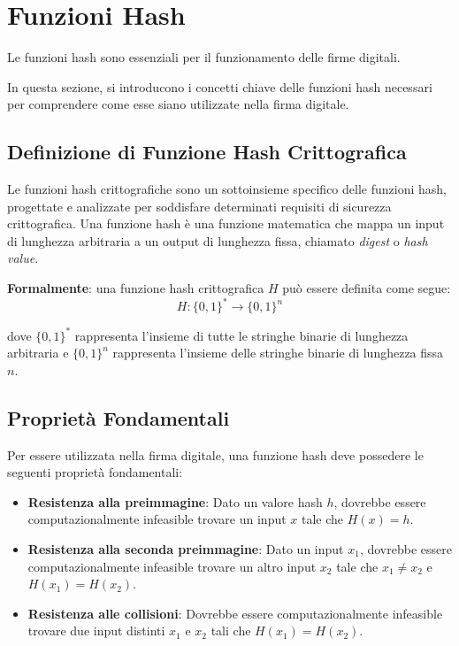 \documentclass[a4paper,12pt]{report}
\begin{document}
\section{Funzioni Hash}
Le funzioni hash sono essenziali per il funzionamento delle firme digitali.

In questa sezione, si introducono i concetti chiave delle funzioni hash necessari per comprendere come esse siano utilizzate nella firma digitale.

\subsection*{Definizione di Funzione Hash Crittografica}
Le funzioni hash crittografiche sono un sottoinsieme specifico delle funzioni hash, progettate e analizzate per soddisfare determinati requisiti di sicurezza crittografica. 
Una funzione hash è una funzione matematica che mappa un input di lunghezza arbitraria a un output di lunghezza fissa, chiamato \textit{digest} o \textit{hash value}.

\textbf{Formalmente}: una funzione hash crittografica $H$ può essere definita come segue:
\[H: \{0,1\}^* \rightarrow \{0,1\}^n\]

dove $\{0,1\}^*$ rappresenta l'insieme di tutte le stringhe binarie di lunghezza arbitraria e $\{0,1\}^n$ rappresenta l'insieme delle stringhe binarie di lunghezza fissa $n$.

\subsection*{Proprietà Fondamentali}

Per essere utilizzata nella firma digitale, una funzione hash deve possedere le seguenti proprietà fondamentali:

\begin{itemize}
    \item \textbf{Resistenza alla preimmagine}: Dato un valore hash $h$, dovrebbe essere computazionalmente infeasible trovare un input $x$ tale che $H(x) = h$.
    \item \textbf{Resistenza alla seconda preimmagine}: Dato un input $x_1$, dovrebbe essere computazionalmente infeasible trovare un altro input $x_2$ tale che $x_1 \neq x_2$ e $H(x_1) = H(x_2)$.
    \item \textbf{Resistenza alle collisioni}: Dovrebbe essere computazionalmente infeasible trovare due input distinti $x_1$ e $x_2$ tali che $H(x_1) = H(x_2)$.
\end{itemize}
\end{document}
